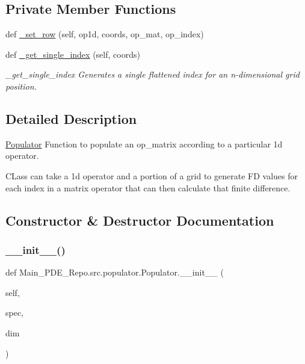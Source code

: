 \subsection*{Private Member Functions}
\begin{DoxyCompactItemize}
\item 
def \hyperlink{classMain__PDE__Repo_1_1src_1_1populator_1_1Populator_ab94a2b5767f776c3a4b62b161a071828}{\+\_\+set\+\_\+row} (self, op1d, coords, op\+\_\+mat, op\+\_\+index)
\item 
def \hyperlink{classMain__PDE__Repo_1_1src_1_1populator_1_1Populator_aabb6d0bae97c41cc83ec81dd5f958fa3}{\+\_\+get\+\_\+single\+\_\+index} (self, coords)
\begin{DoxyCompactList}\small\item\em \+\_\+get\+\_\+single\+\_\+index Generates a single flattened index for an n-\/dimensional grid position. \end{DoxyCompactList}\end{DoxyCompactItemize}


\subsection{Detailed Description}
\hyperlink{classMain__PDE__Repo_1_1src_1_1populator_1_1Populator}{Populator} Function to populate an op\+\_\+matrix according to a particular 1d operator. 

C\+Lass can take a 1d operator and a portion of a grid to generate FD values for each index in a matrix operator that can then calculate that finite difference. 

\subsection{Constructor \& Destructor Documentation}
\mbox{\label{classMain__PDE__Repo_1_1src_1_1populator_1_1Populator_a2bf19f9a4fdf912a755f2ba62a583c8f}} 
\subsubsection{\texorpdfstring{\+\_\+\+\_\+init\+\_\+\+\_\+()}{\_\_init\_\_()}}
{\footnotesize\ttfamily def Main\+\_\+\+P\+D\+E\+\_\+\+Repo.\+src.\+populator.\+Populator.\+\_\+\+\_\+init\+\_\+\+\_\+ (\begin{DoxyParamCaption}\item[{}]{self,  }\item[{}]{spec,  }\item[{}]{dim }\end{DoxyParamCaption})}




